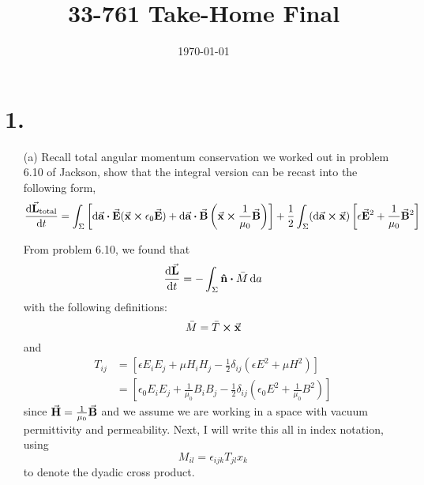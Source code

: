 \documentclass[a4paper,twoside]{article}
\title{33-761 Take-Home Final}
\date{\today}
\begin{document}
\maketitle

\section*{1.}
\begin{itemize}
    \item[(a)] Recall total angular momentum conservation we worked out in problem 6.10 of Jackson, show that the integral version can be recast into the following form,
        \begin{equation}
            \dv{ \va{L}_{\text{total}}}{t} = \int_{\Sigma} \left[ \dd{ \va{a}} \vdot \va{E} ( \va{x} \cross \epsilon_0 \va{E}) + \dd{ \va{a}} \vdot \va{B} \left( \va{x} \cross \frac{1}{\mu_0} \va{B} \right) \right] + \frac{1}{2} \int_{\Sigma} ( \dd{ \va{a}} \cross \va{x}) \left[ \epsilon \va{E}^2 + \frac{1}{\mu_0} \va{B}^2 \right]
        \end{equation}
        \begin{problem}
            From problem 6.10, we found that
            \begin{equation}
                \dv{ \va{L}}{t} = -\int_{\Sigma} \vu{n} \vdot \bar{M} \dd{a}
            \end{equation}
            with the following definitions:
            \begin{equation}
                \bar{M} = \bar{T} \cross \va{x}
            \end{equation}
            and
            \begin{align}
                T_{ij} &= \left[ \epsilon E_i E_j + \mu H_i H_j - \frac{1}{2} \delta_{ij} \left( \epsilon E^2 + \mu H^2 \right) \right] \\
                &= \left[ \epsilon_0 E_i E_j + \frac{1}{\mu_0} B_i B_j - \frac{1}{2} \delta_{ij} \left( \epsilon_0 E^2 + \frac{1}{\mu_0} B^2 \right) \right]
            \end{align}
            since $ \va{H} = \frac{1}{\mu_0} \va{B} $ and we assume we are working in a space with vacuum permittivity and permeability. Next, I will write this all in index notation, using
            \begin{equation}
                M_{il} = \epsilon_{ijk} T_{jl} x_k
            \end{equation}
            to denote the dyadic cross product.
            \begin{align}

\end{align}
\end{problem}
\end{itemize}
\end{document}
